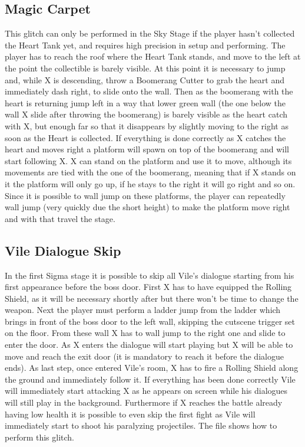 \subsection{Magic Carpet}
This glitch can only be performed in the Sky Stage if the player hasn't collected the Heart Tank yet, and requires high precision in setup and performing. The player has to reach the roof where the Heart Tank stands, and move to the left at the point the collectible is barely visible. At this point it is necessary to jump and, while X is descending, throw a Boomerang Cutter to grab the heart and immediately dash right, to slide onto the wall. Then as the boomerang with the heart is returning jump left in a way that lower green wall (the one below the wall X slide after throwing the boomerang) is barely visible as the heart catch with X, but enough far so that it disappears by slightly moving to the right as soon as the Heart is collected. If everything is done correctly as X catches the heart and moves right a platform will spawn on top of the boomerang and will start following X. X can stand on the platform and use it to move, although its movements are tied with the one of the boomerang, meaning that if X stands on it the platform will only go up, if he stays to the right it will go right and so on. Since it is possible to wall jump on these platforms, the player can repeatedly wall jump (very quickly due the short height) to make the platform move right and with that travel the stage.

\subsection{Vile Dialogue Skip}
In the first Sigma stage it is possible to skip all Vile's dialogue starting from his first appearance before the boss door. First X has to have equipped the Rolling Shield, as it will be necessary shortly after but there won't be time to change the weapon. Next the player must perform a ladder jump from the ladder which brings in front of the boss door to the left wall, skipping the cutscene trigger set on the floor. From these wall X has to wall jump to the right one and slide to enter the door. As X enters the dialogue will start playing but X will be able to move and reach the exit door (it is mandatory to reach it before the dialogue ends). As  last step, once entered Vile's room, X has to fire a Rolling Shield along the ground and immediately follow it. If everything has been done correctly Vile will immediately start attacking X as he appears on screen while his dialogues will still play in the background. Furthermore if X reaches the battle already having low health it is possible to even skip the first fight as Vile will immediately start to shoot his paralyzing projectiles. The file  shows how to perform this glitch.

